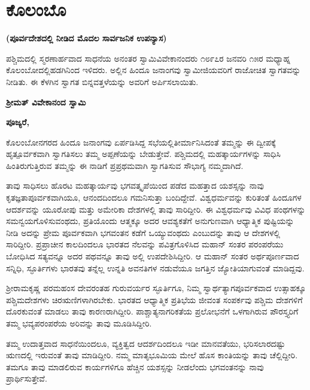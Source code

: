 
\chapter{ಕೊಲಂಬೊ}

\begin{center}
\textbf{(ಪೂರ್ವದೇಶದಲ್ಲಿ ನೀಡಿದ ಮೊದಲ ಸಾರ್ವಜನಿಕ ಉಪನ್ಯಾಸ)}
\end{center}

ಪಶ್ಚಿಮದಲ್ಲಿ ಸ್ಮರಣಾರ್ಹವಾದ ಸಾಧನೆಯ ಅನಂತರ ಸ್ವಾಮಿ\break ವಿವೇಕಾನಂದರು ೧೮೯೭ರ ಜನವರಿ ೧೫ರ ಮಧ್ಯಾಹ್ನ ಕೊಲಂಬೋದಲ್ಲಿ\break ಹಡಗಿನಿಂದ ಇಳಿದರು. ಅಲ್ಲಿನ ಹಿಂದೂ ಜನಾಂಗವು ಸ್ವಾಮೀಜಿಯವರಿಗೆ ರಾಜೋಚಿತ ಸ್ವಾಗತವನ್ನು ನೀಡಿತು. ಈ ಕೆಳಗಿನ ಸ್ವಾಗತ ಬಿನ್ನವತ್ತಳೆಯನ್ನು ಅವರಿಗೆ ಅರ್ಪಿಸಲಾಯಿತು.

\begin{center}
\textbf{ಶ‍್ರೀಮತ್​ ವಿವೇಕಾನಂದ ಸ್ವಾಮಿ}
\end{center}

\textbf{ಪೂಜ್ಯರೆ,}

\vskip 2pt

ಕೊಲಂಬೋನಗರದ ಹಿಂದೂ ಜನಾಂಗವು ಏರ್ಪಡಿಸಿದ್ದ ಸಭೆಯಲ್ಲಿ\break ತೀರ್ಮಾನಿಸಿದಂತೆ ತಮ್ಮನ್ನು ಈ ದ್ವೀಪಕ್ಕೆ ಹೃತ್ಪೂರ್ವಕವಾಗಿ ಸ್ವಾಗತಿಸಲು ತಮ್ಮ ಅಪ್ಪಣೆಯನ್ನು ಬೇಡುತ್ತೇವೆ. ಪಶ್ಚಿಮದಲ್ಲಿ ಮಹತ್ಕಾರ್ಯಗಳನ್ನು ಸಾಧಿಸಿ ಹಿಂತಿರುಗುತ್ತಿರುವ ತಮ್ಮನ್ನು ಈ ನಾಡಿಗೆ ಪ್ರಪ್ರಥಮವಾಗಿ ಸ್ವಾಗತಿಸುವ ಸೌಭಾಗ್ಯ ನಮ್ಮದಾಗಿದೆ.

ತಾವು ಸಾಧಿಸಲು ಹೊರಟ ಮಹತ್ಕಾರ್ಯವು ಭಗವತ್ಕೃಪೆಯಿಂದ ಪಡೆದ ಮಹತ್ತಾದ ಯಶಸ್ಸನ್ನು ನಾವು ಕೃತಜ್ಞತಾಪೂರ್ವಕವಾಗಿಯೂ, ಆನಂದ\-ದಿಂದಲೂ ಗಮನಿಸುತ್ತಾ ಬಂದಿದ್ದೇವೆ. ವಿಶ್ವಧರ್ಮವನ್ನು ಕುರಿತಂತೆ ಹಿಂದೂಗಳ ಆದರ್ಶವನ್ನು ಯೂರೋಪು ಮತ್ತು ಅಮೇರಿಕಾ ದೇಶಗಳಲ್ಲಿ ತಾವು ಸಾರಿದ್ದೀರಿ. ಈ ವಿಶ್ವಧರ್ಮವು ವಿವಿಧ ಪಂಥಗಳನ್ನು ಸಮನ್ವಯಗೊಳಿಸುವಂಥದು, ಪ್ರತಿಯೊಂದು ಆತ್ಮಕ್ಕೂ ಅದರ ಆವಶ್ಯಕತೆಗೆ ಅನುಗುಣವಾಗಿ ಆಧ್ಯಾತ್ಮಿಕ ಪುಷ್ಟಿಯನ್ನು ನೀಡಿ ಅದನ್ನು ಪ್ರೇಮ ಪೂರ್ವಕವಾಗಿ ಭಗವಂತನ ಕಡೆಗೆ ಒಯ್ಯುವಂಥದು ಎಂಬುದನ್ನು ತಾವು ಆ ದೇಶಗಳಲ್ಲಿ ಸಾರಿದ್ದೀರಿ. ಪ್ರಪ್ರಾಚೀನ ಕಾಲದಿಂದಲೂ ಭಾರತದ ನೆಲವನ್ನು ಪವಿತ್ರಗೊಳಿಸಿದ ಮಹಾನ್​ ಸಂತರ ಪರಂಪರೆಯು ಬೋಧಿಸಿದ ಸತ್ಯವನ್ನೂ ಅದರ ಪಥವನ್ನೂ ತಾವು ಅಲ್ಲಿ ಉಪದೇಶಿಸಿದ್ದೀರಿ. ಆ ಮಹಾನ್​ ಸಂತರ ಅರ್ಥಪೂರ್ಣವಾದ ಸನ್ನಿಧಿ, ಸ್ಫೂರ್ತಿಗಳು ಭಾರತವು ತನ್ನೆಲ್ಲ ಉನ್ನತಿ ಅವನತಿಗಳ ನಡುವೆಯೂ ಜಗತ್ತಿನ ಜ್ಯೋತಿಯಾಗುವಂತೆ ಮಾಡಿದ್ದವು.

ಶ‍್ರೀರಾಮಕೃಷ್ಣ ಪರಮಹಂಸ ದೇವರಂತಹ ಗುರುವರ್ಯರ ಸ್ಫೂರ್ತಿಗೂ, ನಿಮ್ಮ ಸ್ವಾರ್ಥತ್ಯಾಗಪೂರ್ವಕವಾದ ಉತ್ಸಾಹಕ್ಕೂ ಪಶ್ಚಿಮದೇಶಗಳು ಚಿರಋಣಿಗಳಾಗಿರಬೇಕು. ಭಾರತದ ಆಧ್ಯಾತ್ಮಿಕ ಪ್ರತಿಭೆಯ ಜೀವಂತ ಸಂಪರ್ಕವು ಪಶ್ಚಿಮ ದೇಶಗಳಿಗೆ ದೊರಕುವಂತೆ ಮಾಡಲು ತಾವು ಕಾರಣರಾಗಿದ್ದೀರಿ. ಪಾಶ್ಚಾತ್ಯ\break ನಾಗರಿಕತೆಯ ಪ್ರಲೋಭನೆಗೆ ಒಳಗಾಗಿರುವ ಪೌರಸ್ತ್ಯರಿಗೆ ತಮ್ಮ ಭವ್ಯ\break ಪರಂಪರೆಯ ಅರಿವನ್ನು ತಾವು ಮೂಡಿಸಿದ್ದೀರಿ.

ತಮ್ಮ ಉದಾತ್ತವಾದ ಸಾಧನೆಯಿಂದಲೂ, ವ್ಯಕ್ತಿತ್ವದ ಆದರ್ಶದಿಂದಲೂ ಇಡೀ ಮಾನವತೆಯು, ಭರಿಸಲಾರದಷ್ಟು ಋಣದಲ್ಲಿ ಇರುವಂತೆ ತಾವು ಮಾಡಿದ್ದೀರಿ. ನಮ್ಮ ಮಾತೃಭೂಮಿಯ ಮೇಲೆ ಹೊಸ ಕಾಂತಿಯನ್ನು ತಾವು ಚೆಲ್ಲಿದ್ದೀರಿ. ತಮಗೂ ತಾವು ಮಾಡಲಿರುವ ಕಾರ್ಯಗಳಿಗೂ ಹೆಚ್ಚಿನ ಯಶಸ್ಸನ್ನು ನೀಡಲೆಂದು ಭಗವಂತನನ್ನು ನಾವು ಪ್ರಾರ್ಥಿಸುತ್ತೇವೆ.

